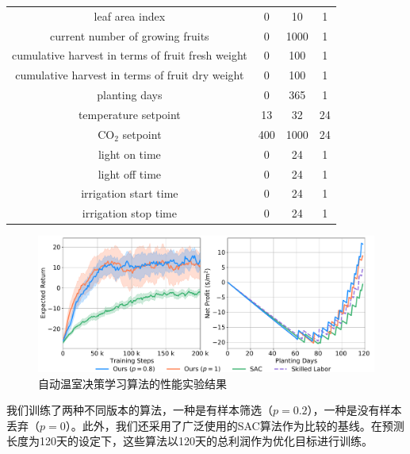 \begin{table}
\begin{tabular}{cccc}
leaf area index                                   & 0            & 10           & 1            \\
current number of growing fruits                  & 0            & 1000         & 1            \\
cumulative harvest in terms of fruit fresh weight & 0            & 100          & 1            \\
cumulative harvest in terms of fruit dry weight   & 0            & 100          & 1            \\
planting days                                     & 0            & 365          & 1            \\
\midrule[1pt]
temperature setpoint          & 13           & 32           & 24           \\
CO$_2$ setpoint               & 400          & 1000         & 24           \\
light on time                 & 0            & 24           & 1            \\
light off time                & 0            & 24           & 1            \\
irrigation start time         & 0            & 24           & 1            \\
irrigation stop time          & 0            & 24           & 1            \\
\bottomrule[1pt]
\end{tabular}
\end{table}

\begin{figure}
\centering
\includegraphics[width=\textwidth]{figures/train-test.pdf}
\caption{自动温室决策学习算法的性能实验结果}
\label{fig:results}
\end{figure}

我们训练了两种不同版本的算法，一种是有样本筛选（$p=0.2$），一种是没有样本丢弃（$p=0$）。此外，我们还采用了广泛使用的SAC算法作为比较的基线。在预测长度为120天的设定下，这些算法以120天的总利润作为优化目标进行训练。

